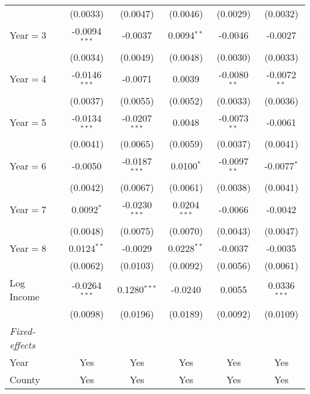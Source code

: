\begin{table}[htbp]
\begin{tabular}{lccccc}
                           & (0.0033)        & (0.0047)        & (0.0046)       & (0.0029)        & (0.0032)\\
      Year$=$3             & -0.0094$^{***}$ & -0.0037         & 0.0094$^{**}$  & -0.0046         & -0.0027\\
                           & (0.0034)        & (0.0049)        & (0.0048)       & (0.0030)        & (0.0033)\\
      Year$=$4             & -0.0146$^{***}$ & -0.0071         & 0.0039         & -0.0080$^{**}$  & -0.0072$^{**}$\\
                           & (0.0037)        & (0.0055)        & (0.0052)       & (0.0033)        & (0.0036)\\
      Year$=$5             & -0.0134$^{***}$ & -0.0207$^{***}$ & 0.0048         & -0.0073$^{**}$  & -0.0061\\
                           & (0.0041)        & (0.0065)        & (0.0059)       & (0.0037)        & (0.0041)\\
      Year$=$6             & -0.0050         & -0.0187$^{***}$ & 0.0100$^{*}$   & -0.0097$^{**}$  & -0.0077$^{*}$\\
                           & (0.0042)        & (0.0067)        & (0.0061)       & (0.0038)        & (0.0041)\\
      Year$=$7             & 0.0092$^{*}$    & -0.0230$^{***}$ & 0.0204$^{***}$ & -0.0066         & -0.0042\\
                           & (0.0048)        & (0.0075)        & (0.0070)       & (0.0043)        & (0.0047)\\
      Year$=$8             & 0.0124$^{**}$   & -0.0029         & 0.0228$^{**}$  & -0.0037         & -0.0035\\
                           & (0.0062)        & (0.0103)        & (0.0092)       & (0.0056)        & (0.0061)\\
      Log Income           & -0.0264$^{***}$ & 0.1280$^{***}$  & -0.0240        & 0.0055          & 0.0336$^{***}$\\
                           & (0.0098)        & (0.0196)        & (0.0189)       & (0.0092)        & (0.0109)\\
      \midrule \emph{Fixed-effects} &   &   &   &   &  \\
      Year                 & Yes             & Yes             & Yes            & Yes             & Yes\\
      County               & Yes             & Yes             & Yes            & Yes             & Yes\\

\end{tabular}
\end{table}
